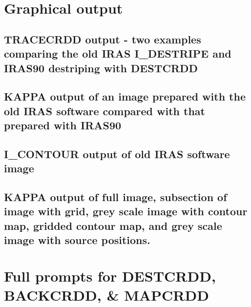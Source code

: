 \section{Graphical output
\label{a:a}}

\subsection{TRACECRDD output - two examples comparing the old IRAS 
I\_DESTRIPE and IRAS90 destriping with DESTCRDD}
\label{a:a1}
\subsection{KAPPA output of an image prepared with the old IRAS software 
compared with that prepared with IRAS90}
\label{a:a2}
\subsection{I\_CONTOUR  output of old IRAS software image}
\label{a:a3}
\subsection{KAPPA output of  full image, subsection of image with grid, grey 
scale image with contour map, gridded contour map, and grey scale image with
source positions.}
\label{a:a4}

%
 
\newpage
\addtocounter{page}{+9}

\newpage

\section{Full prompts for DESTCRDD, BACKCRDD, \& MAPCRDD
\label{a:fulldbm}}

